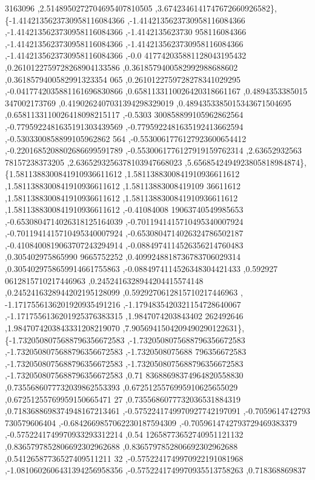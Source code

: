 \begin{DoxyCode}
      3163096 ,2.5148950272704695407810505 ,3.6742346141747672660926582\},
\{-1.4142135623730958116084366 ,-1.4142135623730958116084366 ,-1.4142135623730958116084366 ,-1.4142135623730
      958116084366 ,-1.4142135623730958116084366 ,-1.4142135623730958116084366 ,-1.4142135623730958116084366 ,-0.0
      417742035881128043195432 ,0.2610122759728268904133586 ,0.3618579400582992988688602 ,0.3618579400582991323354
      065 ,0.2610122759728278341029295 ,-0.0417742035881161696830866 ,0.6581133110026420318661167 ,0.4894353385015
      347002173769 ,0.4190262407031394298329019 ,0.4894353385015343671504695 ,0.6581133110026418098215117 ,-0.5303
      300858899105962862564 ,-0.7795922481635191303439569 ,-0.7795922481635192413662594 ,-0.5303300858899105962862
      564 ,-0.5530061776127923600654412 ,-0.2201685208802686699591789 ,-0.5530061776127919159762314 ,2.63652932563
      78157238373205 ,2.6365293256378103947668023 ,5.6568542494923805818984874\},
\{1.5811388300841910936611612 ,1.5811388300841910936611612 ,1.5811388300841910936611612 ,1.58113883008419109
      36611612 ,1.5811388300841910936611612 ,1.5811388300841910936611612 ,1.5811388300841910936611612 ,-0.41084008
      19063740549985653 ,-0.6530804714026318125164039 ,-0.7011941415710495340007924 ,-0.7011941415710495340007924 
      ,-0.6530804714026324786502187 ,-0.4108400819063707243294914 ,-0.0884974114526356214760483 ,0.305402975865990
      9665752252 ,0.4099248818736783706029314 ,0.3054029758659914661755863 ,-0.0884974114526348304421433 ,0.592927
      0612815710217446963 ,0.2452416328944204415574148 ,0.2452416328944202195128099 ,0.5929270612815710217446963 ,
      -1.1717556136201920935491216 ,-1.1794835420321154728640067 ,-1.1717556136201925376383315 ,1.9847074203843402
      262492646 ,1.9847074203843331208219070 ,7.9056941504209490290122631\},
\{-1.7320508075688796356672583 ,-1.7320508075688796356672583 ,-1.7320508075688796356672583 ,-1.7320508075688
      796356672583 ,-1.7320508075688796356672583 ,-1.7320508075688796356672583 ,-1.7320508075688796356672583 ,0.71
      83688698374964820558830 ,0.7355686077732039862553393 ,0.6725125576995910625655029 ,0.67251255769959150665471
      27 ,0.7355686077732036531884319 ,0.7183688698374948167213461 ,-0.5752241749970927742197091 ,-0.7059614742793
      730579606404 ,-0.6842669857062230187594309 ,-0.7059614742793729469383379 ,-0.5752241749970933293312214 ,0.54
      12658773652740951121132 ,0.8365797852806692302962688 ,0.8365797852806692302962688 ,0.54126587736527409511211
      32 ,-0.5752241749970922191081968 ,-1.0810602606431394256958356 ,-0.5752241749970935513758263 ,0.718368869837

\end{DoxyCode}

